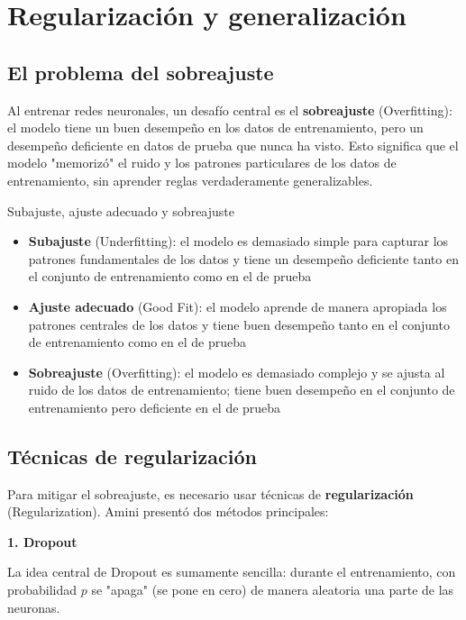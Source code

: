 \section{Regularización y generalización}

\subsection{El problema del sobreajuste}

Al entrenar redes neuronales, un desafío central es el \textbf{sobreajuste} (Overfitting): el modelo tiene un buen desempeño en los datos de entrenamiento, pero un desempeño deficiente en datos de prueba que nunca ha visto. Esto significa que el modelo "memorizó" el ruido y los patrones particulares de los datos de entrenamiento, sin aprender reglas verdaderamente generalizables.

\begin{importantbox}{Subajuste, ajuste adecuado y sobreajuste}
\begin{itemize}
\item \textbf{Subajuste} (Underfitting): el modelo es demasiado simple para capturar los patrones fundamentales de los datos y tiene un desempeño deficiente tanto en el conjunto de entrenamiento como en el de prueba
\item \textbf{Ajuste adecuado} (Good Fit): el modelo aprende de manera apropiada los patrones centrales de los datos y tiene buen desempeño tanto en el conjunto de entrenamiento como en el de prueba
\item \textbf{Sobreajuste} (Overfitting): el modelo es demasiado complejo y se ajusta al ruido de los datos de entrenamiento; tiene buen desempeño en el conjunto de entrenamiento pero deficiente en el de prueba
\end{itemize}
\end{importantbox}

\subsection{Técnicas de regularización}

Para mitigar el sobreajuste, es necesario usar técnicas de \textbf{regularización} (Regularization). Amini presentó dos métodos principales:

\textbf{1. Dropout}

La idea central de Dropout es sumamente sencilla: durante el entrenamiento, con probabilidad $p$ se "apaga" (se pone en cero) de manera aleatoria una parte de las neuronas.

